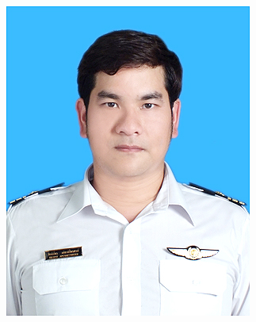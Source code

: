 \documentclass{res}
\begin{document}
\thispagestyle{empty} %
\hfill \includegraphics[scale=1]{myphoto2}
\address{{\bf Office Address} \\ Air Traffic Data Systems Engineering Department \\
  Aeronautical Radio of Thailand \\   Sathon, Bangkok, Thailand 10120 \\ (+66) 2285-9177}    
                                      
\address{{\bf Permanent Address} \\ 7/639 Vibhavadee-Rangsit Rd. \\ Chatuchak, Bangkok 10900\\
  (+66) 2537-0097}
\end{document}
